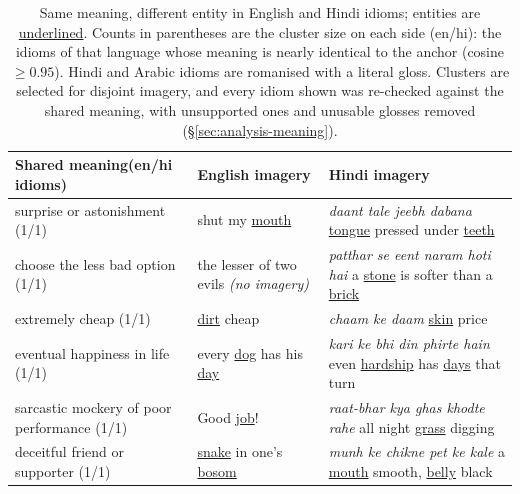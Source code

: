\begin{table}[t]
\centering
\footnotesize
\setlength{\tabcolsep}{4pt}
\renewcommand{\arraystretch}{1.12}
\caption{Same meaning, different entity in \textcolor{encolor}{English} and \textcolor{zhcolor}{Hindi} idioms; entities are \underline{underlined}. Counts in parentheses are the cluster size on each side (en/hi): the idioms of that language whose meaning is nearly identical to the anchor (cosine $\geq 0.95$). Hindi and Arabic idioms are romanised with a literal gloss. Clusters are selected for disjoint imagery, and every idiom shown was re-checked against the shared meaning, with unsupported ones and unusable glosses removed (\S\ref{sec:analysis-meaning}).}
\label{tab:meaning-cases-enhi}
\begin{tabular}{@{}p{}p{}p{}@{}}
\toprule
Shared meaning\newline (en/hi idioms) & \textcolor{encolor}{English imagery} & \textcolor{zhcolor}{Hindi imagery} \\
\midrule
surprise or astonishment (1/1)
& shut my \underline{mouth}
& \textit{daant tale jeebh dabana} \underline{tongue} pressed under \underline{teeth} \\
choose the less bad option (1/1)
& the lesser of two evils \textit{(no imagery)}
& \textit{patthar se eent naram hoti hai} a \underline{stone} is softer than a \underline{brick} \\
extremely cheap (1/1)
& \underline{dirt} cheap
& \textit{chaam ke daam} \underline{skin} price \\
eventual happiness in life (1/1)
& every \underline{dog} has his \underline{day}
& \textit{kari ke bhi din phirte hain} even \underline{hardship} has \underline{days} that turn \\
sarcastic mockery of poor performance (1/1)
& Good \underline{job}!
& \textit{raat-bhar kya ghas khodte rahe} all night \underline{grass} digging \\
deceitful friend or supporter (1/1)
& \underline{snake} in one's \underline{bosom}
& \textit{munh ke chikne pet ke kale} a \underline{mouth} smooth, \underline{belly} black \\
\bottomrule
\end{tabular}
\end{table}

